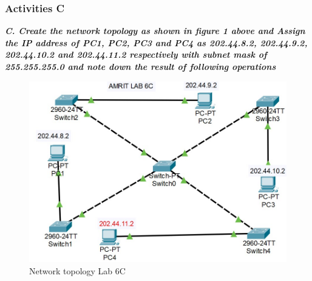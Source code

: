 \documentclass[a4paper,11pt]{article}
\begin{document}


\subsubsection{Activities C}

{\bfseries \textit{C. Create the network topology as shown in figure 1 above and Assign the IP address of PC1,  PC2, PC3 and PC4 as 202.44.8.2, 202.44.9.2, 202.44.10.2 and 202.44.11.2 respectively with subnet mask of 255.255.255.0 and note down the result of following operations}}


\begin{figure}[H]
    \centering
    \includegraphics[scale=0.9,cframe=blue 0.5pt 3pt]{./FIG/Lab6C.jpg}
    \caption{Network topology Lab 6C}
\end{figure}
\end{document}
